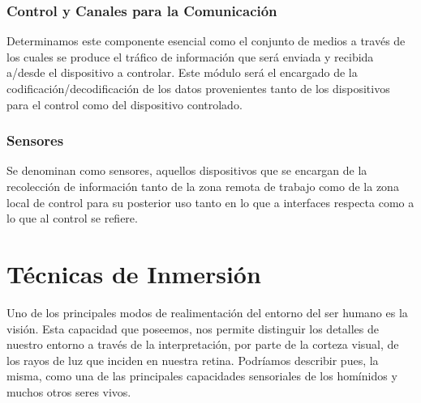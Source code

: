 \subsubsection{Control y Canales para la Comunicación}

Determinamos este componente esencial como el conjunto de medios a través de los cuales se produce el tráfico de información que será enviada y recibida a/desde el dispositivo a controlar. Este módulo será el encargado de la codificación/decodificación de los datos provenientes tanto de los dispositivos para el control como del dispositivo controlado.

\subsubsection{Sensores}

Se denominan como sensores, aquellos dispositivos que se encargan de la recolección de información tanto de la zona remota de trabajo como de la zona local de control para su posterior uso tanto en lo que a interfaces respecta como a lo que al control se refiere.

\section{Técnicas de Inmersión}

Uno de los principales modos de realimentación del entorno del ser humano es la visión. Esta capacidad que poseemos, nos permite distinguir los detalles de nuestro entorno a través de la interpretación, por parte de la corteza visual, de los rayos de luz que inciden en nuestra retina. Podríamos describir pues, la misma, como una de las principales capacidades sensoriales de los homínidos y muchos otros seres vivos.

